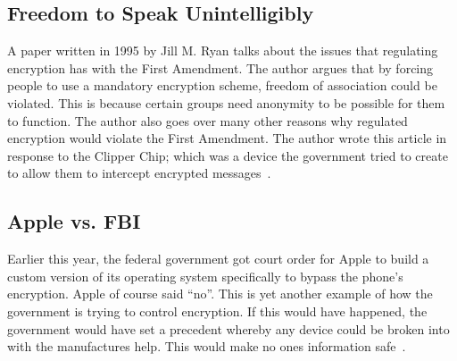\documentclass[12pt,a4paper,titlepage]{article}
\begin{document}
\subsection{Freedom to Speak Unintelligibly}
A paper written in 1995 by Jill M. Ryan talks about the issues that regulating 
encryption has with the First Amendment. The author argues that by forcing 
people to use a mandatory encryption scheme, freedom of association could be 
violated. This is because certain groups need anonymity to be possible for them 
to function. The author also goes over many other reasons why regulated 
encryption would violate the First Amendment. The author wrote this article in 
response to the Clipper Chip; which was a device the government tried to create 
to allow them to intercept encrypted messages~\cite{ryan1995freedom}.

\subsection{Apple vs. FBI}
Earlier this year, the federal government got court order for Apple to build 
a custom version of its operating system specifically to bypass the phone's 
encryption. Apple of course said ``no''. This is yet another example of how the 
government is trying to control encryption. If this would have happened, the 
government would have set a precedent whereby any device could be broken into 
with the manufactures help. This would make no ones information 
safe~\cite{herman2016fbi}. 

\newpage

\appendix

\newpage
\printbibliography[
heading=bibintoc,
title={Resources}
]
\end{document}
